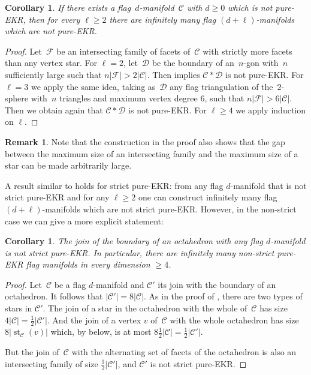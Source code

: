 \documentclass[a4paper,12pt]{amsart}
\theoremstyle{plain}
\newtheorem{corollary}[theorem]{Corollary}
\theoremstyle{definition}
\newtheorem{remark}[theorem]{Remark}
\newcommand{\C}{\mathcal C}
\newcommand{\D}{\mathcal D}
\newcommand{\family}{\mathcal F}
\DeclareMathOperator{\st}{st}
\begin{document}
\begin{corollary}
  \label{cor:nonEKR}
  If there exists a flag~$d$-manifold~$\C$ with $d \geq 0$ which is not pure-EKR, then for every $\ell \geq 2$
  there are infinitely many flag $(d+\ell)$-manifolds which are not pure-EKR.
\end{corollary}

\begin{proof}
  Let~$\family$ be an intersecting family of facets of~$\C$ with strictly more facets than  any vertex star.
  For $\ell=2$, let~$\D$ be the boundary of an~$n$-gon with~$n$ sufficiently large such that $n |\family| > 2 |\C|$.
  Then  implies $\C\ast\D$ is not pure-EKR.
  For $\ell=3$ we apply the same idea, taking as~$\D$ any flag triangulation of the~$2$-sphere with~$n$ triangles and maximum vertex degree $6$, such that $n|\family| > 6|\C|$.
  Then we obtain again that $\C\ast\D$ is not pure-EKR.
  For $\ell\ge 4$ we apply induction on $\ell$.
\end{proof}

\begin{remark}
  Note that the construction in the proof also shows that the gap between the maximum size of an intersecting family and the maximum size of a star can be made arbitrarily large.
  \end{remark}

A result similar to  holds for strict pure-EKR: from any flag $d$-manifold that is not strict pure-EKR and for any $\ell \geq 2$ one can construct infinitely many  flag $(d+\ell)$-manifolds which are not strict pure-EKR. However, in the non-strict case we can give a more explicit statement:

\begin{corollary}
  \label{cor:nonEKR-2}
  The join of the boundary of an octahedron with any flag $d$-manifold is not strict pure-EKR. In particular, there are infinitely many non-strict pure-EKR flag manifolds in every dimension $\ge 4$.
\end{corollary}

\begin{proof}
Let~$\C$ be a flag $d$-manifold and $\C'$ its join with the boundary of an octahedron. It follows that $|\C'|=8|\C|$. As in the proof of , there are two types of stars in $\C'$. The join of a star in the octahedron with the whole of~$\C$ has size $4|\C|=\frac12|\C'|$. And the join of a vertex $v$ of~$\C$ with the whole octahedron has size $8 |\st_\C (v)|$ which, by  below,
is at most $8 \frac12 |\C|=\frac12 |\C'|$.

But the join of~$\C$ with the alternating set of facets of the octahedron is also an intersecting family of size $\frac12 |\C'|$, and $\C'$ is not strict pure-EKR.
\end{proof}
\end{document}
